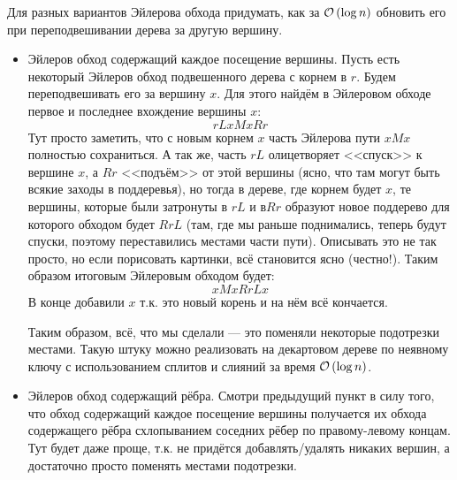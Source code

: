 \begin{task}[3]
Для разных вариантов Эйлерова обхода придумать, как за $\mathcal{O}\left(\log{n}\right)$ обновить его при переподвешивании дерева за другую вершину.
\end{task}
\begin{solution}
\begin{itemize}
	\item Эйлеров обход содержащий каждое посещение вершины. Пусть есть некоторый Эйлеров обход подвешенного дерева с корнем в $r$. Будем переподвешивать его за вершину $x$. Для этого найдём в Эйлеровом обходе первое и последнее вхождение вершины $x$:
	\[
		r L x M x R r
	\]
	Тут просто заметить, что с новым корнем $x$ часть Эйлерова пути $xMx$ полностью сохраниться. А так же, часть $rL$ олицетворяет <<спуск>> к вершине $x$, а $Rr$ <<подъём>> от этой вершины (ясно, что там могут быть всякие заходы в поддеревья), но тогда в дереве, где корнем будет $x$, те вершины, которые были затронуты в $rL$ и в$Rr$ образуют новое поддерево для которого обходом будет $RrL$ (там, где мы раньше поднимались, теперь будут спуски, поэтому переставились местами части пути). Описывать это не так просто, но если порисовать картинки, всё становится ясно (честно!). Таким образом итоговым Эйлеровым обходом будет:
	\[
		x M x R r L x
	\]
	В конце добавили $x$ т.к. это новый корень и на нём всё кончается.

	Таким образом, всё, что мы сделали --- это поменяли некоторые подотрезки местами. Такую штуку можно реализовать на декартовом дереве по неявному ключу с использованием сплитов и слияний за время $\mathcal{O}\left(\log{n}\right)$. \xqed
	\item Эйлеров обход содержащий рёбра. Смотри предыдущий пункт в силу того, что обход содержащий каждое посещение вершины получается их обхода содержащего рёбра схлопыванием соседних рёбер по правому-левому концам. Тут будет даже проще, т.к. не придётся добавлять/удалять никаких вершин, а достаточно просто поменять местами подотрезки. \xqed
\end{itemize}
\end{solution}

